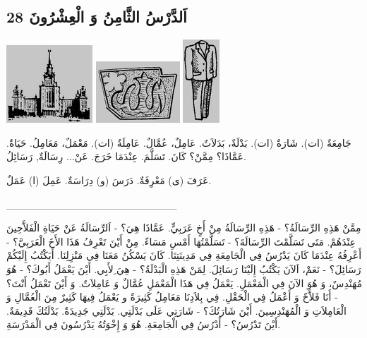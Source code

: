 \documentclass[a5paper]{article}
\begin{document}
\subsection[28 اَلدَّرْسُ الثَّامِنُ وَ الْعِشْرُونَ]{28 اَلدَّرْسُ الثَّامِنُ وَ الْعِشْرُونَ}
 \includegraphics[width=1.2709in,height=1.1457in]{images/MuhammadBagauddinprettified-img057.png}   \includegraphics[width=1.2398in,height=0.9063in]{images/MuhammadBagauddinprettified-img058.png}   \includegraphics[width=0.5417in,height=1.2291in]{images/MuhammadBagauddinprettified-img059.png} 

جَامِعَةٌ (ات). شَارَةٌ (ات). بَدْلَةٌ، بَدَلاَتٌ. عَامِلٌ، عُمَّالٌ. عَامِلَةٌ (ات). مَعْمَلٌ، مَعَامِلُ. حَيَاةٌ. عَمَّاذَا؟ مِمَّنْ؟ كَانَ. تَسَلَّمَ. عِنْدَمَا خَرَجَ. عَنْ... رِسَالَةٌ, رَسَائِلُ.

عَرَفَ (ى) مَعْرِفَةٌ. دَرَسَ (و) دِرَاسَةٌ. عَمِلَ (ا) عَمَلٌ. 

\_\_\_\_\_\_\_\_\_\_\_\_\_\_\_\_\_\_\_\_\_\_\_

مِمَّنْ هَذِهِ الرِّسَالَةُ؟ - هَذِهِ الرِّسَالَةُ مِنْ أَخٍ عَرَبِيٍّ. عَمَّاذَا هِيَ؟ - اَلرِّسَالَةُ عَنْ حَيَاةِ الْفَلاَّحِينَ عِنْدَهُمْ. مَتَى تَسَلَّمْتَ الرِّسَالَةَ؟ - تَسَلَّمْتُهَا أَمْسِ مَسَاءً. مِنْ أَيْنَ تَعْرِفُ هَذَا الأَخَ الْعَرَبِيَّ؟ - أَعْرِفُهُ عِنْدَمَا كَانَ يَدْرُسُ فِي الْجَامِعَةِ فِي مَدِينَتِنَا. كَانَ يَسْكُنُ مَعَنَا فِي مَنْزِلِنَا. أَيَكْتُبُ إِلَيْكُمْ رَسَائِلَ؟ - نَعَمْ، اَلآنَ يَكْتُبُ إِلَيْنَا رَسَائِلَ. لِمَنْ هَذِهِ الْبَدْلَةُ؟ - هِيَ ِلأَبِي. أَيْنَ يَعْمَلُ أَبُوكَ؟ - هُوَ مُهَنْدِسٌ، وَ هُوَ الآنَ فِي الْمَعْمَلِ. يَعْمَلُ فِي هَذَا الْمَعْمَلِ عُمَّالٌ وَ عَامِلاَتٌ. وَ أَيْنَ تَعْمَلُ أَنْتَ؟ - أَنَا فَلاَّحٌ وَ أَعْمَلُ فِي الْحَقْلِ. فِي بِلاَدِنَا مَعَامِلُ كَثِيرَةٌ و يَعْمَلُ فِيهَا كَثِيرٌ مِنَ الْعُمَّالِ وَ الْعَامِلاَتِ وَ الْمُهَنْدِسِينَ. أَيْنَ شَارَتُكَ؟ - شَارَتِي عَلَى بَدْلَتِي. بَدْلَتِي جَدِيدَةٌ. بَدْلَتُكَ قَدِيمَةٌ. أَيْنَ تَدْرُسُ؟ - أَدْرُسُ فِي الْجَامِعَةِ. هُوَ وَ إِخْوَتُهُ يَدْرُسُونَ فِي الْمَدْرَسَةِ.
\end{document}
